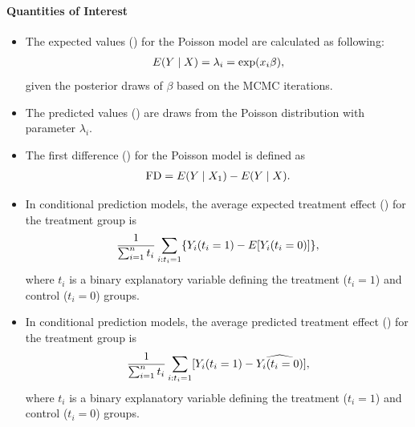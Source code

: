 \documentclass[letterpaper,10pt,english]{sphinxmanual}
\begin{document}
\paragraph{Quantities of Interest}
\label{zelig-poissonbayes:quantities-of-interest}\begin{itemize}
\item {} 
The expected values () for the Poisson model are calculated
as following:
\begin{gather}
\begin{split}\begin{aligned}
E(Y\mid X) = \lambda_i = \exp(x_i \beta),\end{aligned}\end{split}\notag
\end{gather}
given the posterior draws of \(\beta\) based on the MCMC
iterations.

\item {} 
The predicted values () are draws from the Poisson
distribution with parameter \(\lambda_i\).

\item {} 
The first difference () for the Poisson model is defined as
\begin{gather}
\begin{split}\begin{aligned}
\text{FD}=E(Y\mid X_{1})-E(Y\mid X).\end{aligned}\end{split}\notag
\end{gather}
\item {} 
In conditional prediction models, the average expected treatment
effect () for the treatment group is
\begin{gather}
\begin{split}\begin{aligned}
\frac{1}{\sum_{i=1}^n t_{i}}\sum_{i:t_{i}=1}\{Y_{i}(t_{i}=1)-E[Y_{i}(t_{i}=0)]\},\end{aligned}\end{split}\notag
\end{gather}
where \(t_{i}\) is a binary explanatory variable defining the
treatment (\(t_{i}=1\)) and control (\(t_{i}=0\)) groups.

\item {} 
In conditional prediction models, the average predicted treatment
effect () for the treatment group is
\begin{gather}
\begin{split}\begin{aligned}
\frac{1}{\sum_{i=1}^n t_{i}}\sum_{i:t_{i}=1}[Y_{i}(t_{i}=1)-\widehat{Y_{i}(t_{i}=0)}],\end{aligned}\end{split}\notag
\end{gather}
where \(t_{i}\) is a binary explanatory variable defining the
treatment (\(t_{i}=1\)) and control (\(t_{i}=0\)) groups.

\end{itemize}
\end{document}
